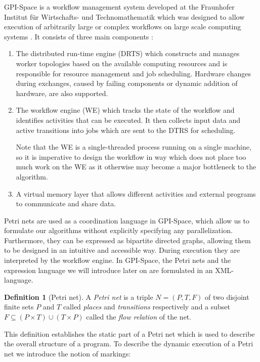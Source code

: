 \documentclass[
  paper=a4,
  titlepage,
  bibliography=totoc,
  listof=totoc,
  pagesize=pdftex
]{scrartcl}
\numberwithin{figure}{section}
\numberwithin{equation}{section}
\numberwithin{table}{section}
\theoremstyle{definition}
\newtheorem{definition}{Definition}
\numberwithin{definition}{section}
\begin{document}
GPI-Space is a workflow management system developed at the Fraunhofer Institut für
Wirtschafts- und Technomathematik which was designed to allow execution of arbitrarily
large or complex workflows on large scale computing systems \cite{gpispace}. It consists
of three main components \cite[Section~4.1]{reinboldGitFan}:
\begin{enumerate}[label=\arabic*.]
  \item The distributed run-time engine (DRTS) which constructs and manages worker
    topologies based on the available computing resources and is responsible for resource
    management and job scheduling. Hardware changes during exchanges, caused by failing
    components or dynamic addition of hardware, are also supported.
  \item The workflow engine (WE) which tracks the state of the workflow and identifies
    activities that can be executed. It then collects input data and active transitions
    into jobs which are sent to the DTRS for scheduling.

    Note that the WE is a single-threaded process running on a single machine, so it is
    imperative to design the workflow in way which does not place too much work on the WE
    as it otherwise may become a major bottleneck to the algorithm.
  \item A virtual memory layer that allows different activities and external programs to
    communicate and share data.
\end{enumerate}

Petri nets are used as a coordination language in GPI-Space, which allow us to formulate
our algorithms without explicitly specifying any parallelization. Furthermore, they can be
expressed as bipartite directed graphs, allowing them to be designed in an intuitive and
accessible way. During execution they are interpreted by the workflow engine. In
GPI-Space, the Petri nets and the expression language we will introduce later on are
formulated in an XML-language.

\begin{definition}[Petri net]
  \label{def:petri}
  A \emph{Petri net} is a triple $N = (P, T, F)$ of two disjoint finite sets $P$ and $T$
  called \emph{places} and \emph{transitions} respectively and a subset $F \subseteq
  (P\times T) \cup (T \times P)$ called the \emph{flow relation} of the net.
\end{definition}

This definition establishes the static part of a Petri net which is used to describe the
overall structure of a program. To describe the dynamic execution of a Petri net we
introduce the notion of markings:
\end{document}
